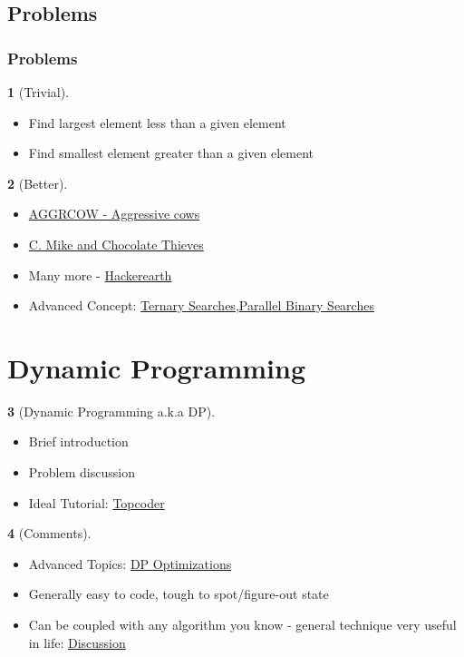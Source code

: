 \documentclass[mathserif,notheorems]{beamer} %
\theoremstyle{plain} %
\theoremstyle{definition} %
\newtheorem*{definition}{}%
\begin{document}
\subsection{Problems}
\begin{frame}
\frametitle{Problems}
	\begin{definition}[Trivial]
		\begin{itemize}
			\item Find largest element less than a given element
			\item Find smallest element greater than a given element
		\end{itemize}
	\end{definition}
	\begin{definition}[Better]
		\begin{itemize}
			\item \href{https://tex.stackexchange.com/questions/107832/how-to-create-internet-link-in-pdf}{AGGRCOW - Aggressive cows}
			\item \href{https://codeforces.com/contest/689/problem/C}{C. Mike and Chocolate Thieves}
			\item Many more - \href{https://www.hackerearth.com/practice/algorithms/searching/binary-search/practice-problems/}{Hackerearth}
			\item Advanced Concept: \href{https://www.hackerearth.com/practice/algorithms/searching/ternary-search/tutorial/}{Ternary Searches},\href{https://codeforces.com/blog/entry/45578}{Parallel Binary Searches}
		\end{itemize}
	\end{definition}
\end{frame}

\section{Dynamic Programming}
\begin{frame}
\begin{definition}[Dynamic Programming a.k.a DP]
	\begin{itemize}
		\item Brief introduction
		\item Problem discussion
		\item Ideal Tutorial: \href{https://www.topcoder.com/community/competitive-programming/tutorials/dynamic-programming-from-novice-to-advanced/}{Topcoder}
	\end{itemize}
\end{definition}
\begin{definition}[Comments]
	\begin{itemize}
		\item Advanced Topics: \href{https://codeforces.com/blog/entry/8219}{DP Optimizations}
		\item Generally easy to code, tough to spot/figure-out state
		\item Can be coupled with any algorithm you know - general technique very useful in life: \href{https://codeforces.com/blog/entry/58589\#comment-422219}{Discussion}
	\end{itemize}
\end{definition}
\end{frame}
\end{document}
